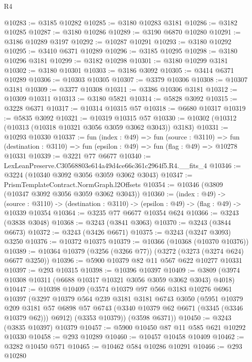 \begin{lexlean}{R4}
\begin{coremodule}
@10283 := @3185 @10282
@10285 := @3180 @10283 @3181
@10286 := @3182 @10285
@10287 := @3180 @10286
@10289 := @3190 @6870 @10280
@10291 := @3186 @10289 @3197
@10292 := @10287 @10291
@10293 := @3180 @10292
@10295 := @3410 @6371 @10289
@10296 := @3185 @10295
@10298 := @3180 @10296 @3181
@10299 := @3182 @10298
@10301 := @3180 @10299 @3181
@10302 := @3180 @10301
@10303 := @3186 @3092
@10305 := @3414 @6371 @10289
@10306 := @10303 @10305
@10307 := @3379 @10306
@10308 := @10307 @3181
@10309 := @3377 @10308
@10311 := @3386 @10306 @3181
@10312 := @10309 @10311
@10313 := @3180 @5821
@10314 := @5828 @3092
@10315 := @3228 @6371
@10317 := @10314 @10315 @57
@10318 := @6680 @10317
@10319 := @5835 @3092
@10321 := @10319 @10315 @57
@10330 := @10302 (@10312 (@10313 (@10318 @10321 @3056 @3059 @3062 @3043)) @3183)
@10331 := @10293 @10330
@10337 := fun (index : @49) =>
  fun (source : @3110) =>
  fun (destination : @3110) => fun (epsilon : @49) => fun (flag : @49) => @10278 @10331
@10339 := @3221 @77 @6677
@10340 := LexLeanPreserve.C30568803e614a49d4ce66c361c2964f5.R4.__fits_4
@10346 := @3224 (@10340 @3092 @3056 @3059 @3062 @3043)
@10347 := PrismTemplateContract.NormGraph.l2Offsets
@10354 := @10346 (@3809 (@10347 @3092 @3056 @3059 @3062 @3043))
@10360 := (index : @49) ->
  (source : @3110) -> (destination : @3110) -> (epsilon : @49) -> (flag : @49) -> @10339 @10354
@10364 := @3235 @77 @6677 @10354 @624
@10366 := @3243 (@3838 @3048)
@10368 := @3243 (@3841 @3063)
@10370 := @3243 (@3844 @6673)
@10372 := @3243 (@3426 @6671)
@10375 := @3243 (@3247 @3093) @3250
@10376 := @10372 @10375
@10379 := @10366 (@10368 (@10370 @10376))
@10389 := @10364 @10379 (@3256 (@3266 @77)) (@3272 (@3273 (@3274 @624) @6677 @3250))
@10396 := @5900 @10379 @82 @11 @567 @622 @10277 @10331
@10397 := @293 @10315
@10398 := @10396 @10397
@10409 := @3809 (@3974 @10308 @10311 (@6688 @10317 @10321 @3056 @3059 @3062 @3043) @4018)
@10447 := @10398
    @10409
    (@3574
      @10379
      @97
      @566
      @3183
      @10276
      @6961
      @10397
      (@3297
        @10379
        @564
        @239
        @3181
        @3181
        @6743
        @3050
        (@5951
          @10379
          @209
          @3181
          @57
          @6898
          @57
          @6743
          (@3340 @10379 @62 @6671 (@3345 (@3346 @10379 @62)))
          @6912)
        (@3353 @10379))
      (@3598 @6371))
@10450 := @3243 (@3835 @10397) @10379
@10457 := @5900 @10450 @87 @11 @585 @621 @10292 @10330
@10458 := @293 @10289
@10460 := @10457 @10458 @10409
@10462 := @3282 @10450 @571
@10465 := @10462 @584 @10286 @10291
@10466 := @293 @10280

\end{coremodule}
\end{lexlean}

